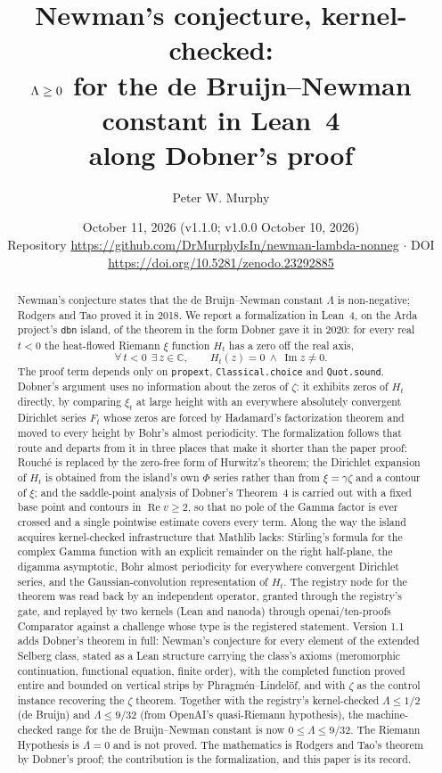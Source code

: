 \documentclass[11pt]{article}
\title{Newman's conjecture, kernel-checked:\\ $\Lam \ge 0$ for the de Bruijn--Newman constant in Lean~4\\ along Dobner's proof}
\author{Peter W. Murphy}
\date{October 11, 2026 (v1.1.0; v1.0.0 October 10, 2026)\\[2pt] \small Repository \url{https://github.com/DrMurphyIsIn/newman-lambda-nonneg} \;$\cdot$\; DOI \url{https://doi.org/10.5281/zenodo.23292885}}
\theoremstyle{definition}
\newcommand{\lean}[1]{\texttt{#1}}
\newcommand{\Lam}{\Lambda}
\newcommand{\Hfun}{H}
\newcommand{\re}{\operatorname{Re}}
\newcommand{\im}{\operatorname{Im}}
\newcommand{\C}{\mathbb{C}}
\begin{document}
\maketitle

\begin{abstract}
Newman's conjecture states that the de Bruijn--Newman constant $\Lam$ is non-negative; Rodgers and Tao proved it in 2018. We report a formalization in Lean~4, on the Arda project's \lean{dbn} island, of the theorem in the form Dobner gave it in 2020: for every real $t < 0$ the heat-flowed Riemann $\xi$ function $\Hfun_t$ has a zero off the real axis,
\[
\forall\, t < 0\ \ \exists\, z \in \C,\qquad \Hfun_t(z) = 0 \ \wedge\ \im z \ne 0 .
\]
The proof term depends only on \lean{propext}, \lean{Classical.choice} and \lean{Quot.sound}. Dobner's argument uses no information about the zeros of $\zeta$: it exhibits zeros of $\Hfun_t$ directly, by comparing $\xi_t$ at large height with an everywhere absolutely convergent Dirichlet series $F_t$ whose zeros are forced by Hadamard's factorization theorem and moved to every height by Bohr's almost periodicity. The formalization follows that route and departs from it in three places that make it shorter than the paper proof: Rouch\'e is replaced by the zero-free form of Hurwitz's theorem; the Dirichlet expansion of $\Hfun_t$ is obtained from the island's own $\Phi$ series rather than from $\xi = \gamma\zeta$ and a contour of $\xi$; and the saddle-point analysis of Dobner's Theorem~4 is carried out with a fixed base point and contours in $\re v \ge 2$, so that no pole of the Gamma factor is ever crossed and a single pointwise estimate covers every term. Along the way the island acquires kernel-checked infrastructure that Mathlib lacks: Stirling's formula for the complex Gamma function with an explicit remainder on the right half-plane, the digamma asymptotic, Bohr almost periodicity for everywhere convergent Dirichlet series, and the Gaussian-convolution representation of $\Hfun_t$. The registry node for the theorem was read back by an independent operator, granted through the registry's gate, and replayed by two kernels (Lean and nanoda) through openai/ten-proofs Comparator against a challenge whose type is the registered statement. Version 1.1 adds Dobner's theorem in full: Newman's conjecture for every element of the extended Selberg class, stated as a Lean structure carrying the class's axioms (meromorphic continuation, functional equation, finite order), with the completed function proved entire and bounded on vertical strips by Phragm\'en--Lindel\"of, and with $\zeta$ as the control instance recovering the $\zeta$ theorem. Together with the registry's kernel-checked $\Lam \le 1/2$ (de Bruijn) and $\Lam \le 9/32$ (from OpenAI's quasi-Riemann hypothesis), the machine-checked range for the de Bruijn--Newman constant is now $0 \le \Lam \le 9/32$. The Riemann Hypothesis is $\Lam = 0$ and is not proved. The mathematics is Rodgers and Tao's theorem by Dobner's proof; the contribution is the formalization, and this paper is its record.
\end{abstract}
\end{document}
